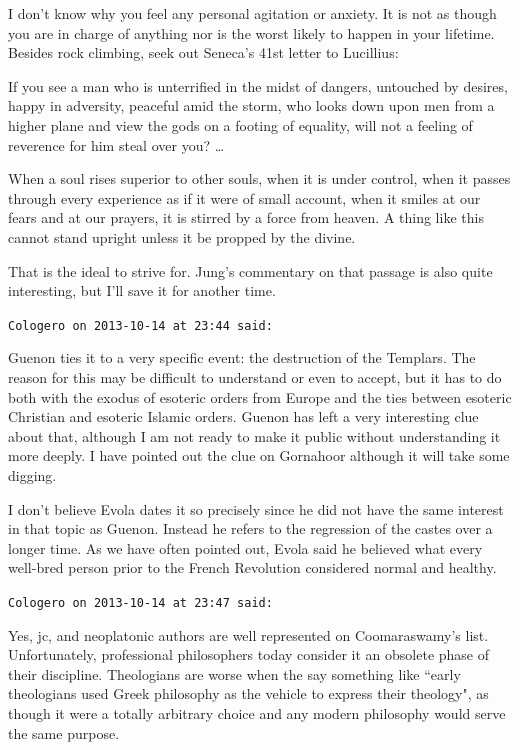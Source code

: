 \begin{footnotesize}
\begin{sffamily}
I don't know why you feel any personal agitation or anxiety. It is not as though you are in charge
of anything nor is the worst likely to happen in your lifetime. Besides rock climbing, seek out
Seneca's 41st letter to Lucillius:

\begin{quotex}
If you see a man who is unterrified in the midst of dangers, untouched by desires, happy in adversity, peaceful amid the
storm, who looks down upon men from a higher plane and view the gods on a footing of equality, will not a feeling of
reverence for him steal over you? …

When a soul rises superior to other souls, when it is under control, when it passes through every experience as if it
were of small account, when it smiles at our fears and at our prayers, it is stirred by a force from heaven. A thing
like this cannot stand upright unless it be propped by the divine. 

\end{quotex}
That is the ideal to strive for. Jung's commentary on that passage is also quite interesting, but
I'll save it for another time.


\hfill

\texttt{Cologero on 2013-10-14 at 23:44 said: }

Guenon ties it to a very specific event: the destruction of the Templars. The reason for this may be difficult to
understand or even to accept, but it has to do both with the exodus of esoteric orders from Europe and the ties between
esoteric Christian and esoteric Islamic orders. Guenon has left a very interesting clue about that, although I am not
ready to make it public without understanding it more deeply. I have pointed out the clue on Gornahoor although it will
take some digging.

I don't believe Evola dates it so precisely since he did not have the same interest in that topic
as Guenon. Instead he refers to the regression of the castes over a longer time. As we have often pointed out, Evola
said he believed what every well-bred person prior to the French Revolution considered normal and healthy.


\hfill

\texttt{Cologero on 2013-10-14 at 23:47 said: }

Yes, jc, and neoplatonic authors are well represented on Coomaraswamy's list. Unfortunately,
professional philosophers today consider it an obsolete phase of their discipline. Theologians are worse when the say
something like ``early theologians used Greek philosophy as the vehicle to express their theology", as though it were a
totally arbitrary choice and any modern philosophy would serve the same purpose.



\end{sffamily}
\end{footnotesize}
